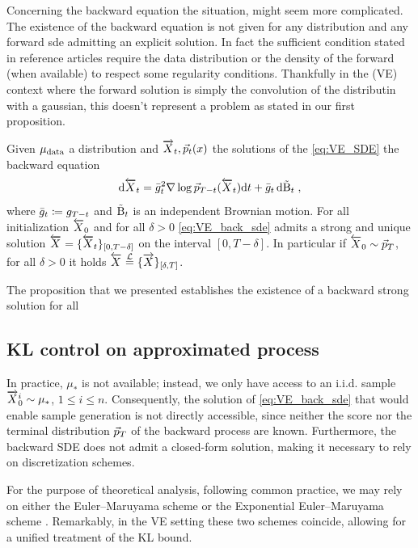 Concerning the backward equation the situation, might seem more complicated. The existence of the backward equation is not given for any distribution and any forward sde admitting an explicit solution. In fact the sufficient condition stated in reference articles \citep{anderson1982reverse,haussmann1986time} require the data distribution 
or the density of the forward (when available) to respect some regularity conditions. Thankfully in the (VE) context where the forward solution is simply the convolution of the distributin with a gaussian, this doesn't represent a problem as stated in our first proposition. 
\begin{proposition}
Given $\mu_{\text{data}}$ a distribution and $\overrightarrow{X}_t, \vec{ p}_{t}(x)$ the solutions of the \eqref{eq:VE_SDE} the backward equation 
\begin{equation}\label{eq:VE_back_sde}
\mathrm{d} \overleftarrow{X}_{t} =   \bar{g}_t^2 \nabla \log \vec{ p}_{T - t} (\overleftarrow{X}_{t}) \mathrm{d} t + \bar{g}_t \, \mathrm{d} \tilde{\operatorname{B}}_t \; ,
\end{equation}
where $\bar{g}_t \coloneqq g_{T-t}$ and $\tilde{\operatorname{B}}_t$ is an independent Brownian motion.
For all initialization $\overleftarrow{X}_{0}$ and for all $\delta>0$  \eqref{eq:VE_back_sde} admits a strong and unique solution $\overleftarrow{X}_{} =\{\overleftarrow{X}_{t}\}_{[0,T-\delta]}$ on the interval $[0, T-\delta]$. 
In particular if $\overleftarrow{X}_{0} \sim \vec{ p}_{T}$, for all $\delta>0$ it holds $\overleftarrow{X}_{} \overset{\mathcal{L}}{=}  \{\overrightarrow{X}\}_{[\delta, T]}$.
\end{proposition}
The proposition that we presented establishes the existence of a backward strong solution for all

\subsection{KL control on approximated process}
In practice,  $\mu_*$ is not available; instead, we only have access to an i.i.d. sample $\overrightarrow{X}_0^i \sim \mu_*$, $1 \leq i \leq n$. 
Consequently, the solution of \cref{eq:VE_back_sde} that would enable sample generation is not directly accessible, since neither the score nor the terminal distribution $\vec{p}_{T}$ of the backward process are known. 
Furthermore, the backward SDE does not admit a closed-form solution, making it necessary to rely on discretization schemes.

For the purpose of theoretical analysis, following common practice, we may rely on either the Euler–Maruyama scheme \cite{gao2025wasserstein, silveri2025beyond} or the Exponential Euler–Maruyama scheme \cite{conforti2023kl, strasman2025analysis}. Remarkably, in the VE setting these two schemes coincide, allowing for a unified treatment of the KL bound.


